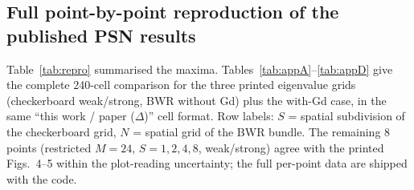 \begin{landscape}
\appendix

\section{Full point-by-point reproduction of the published PSN results}

Table~\ref{tab:repro} summarised the maxima. Tables~\ref{tab:appA}--\ref{tab:appD} give the complete 240-cell comparison for the three printed eigenvalue grids (checkerboard weak/strong, BWR without Gd) plus the with-Gd case, in the same ``this work / paper ($\Delta$)'' cell format. Row labels: $S$ = spatial subdivision of the checkerboard grid, $N$ = spatial grid of the BWR bundle. The remaining 8 points (restricted $M=24$, $S=1,2,4,8$, weak/strong) agree with the printed Figs.~4--5 within the plot-reading uncertainty; the full per-point data are shipped with the code.


\end{landscape}
